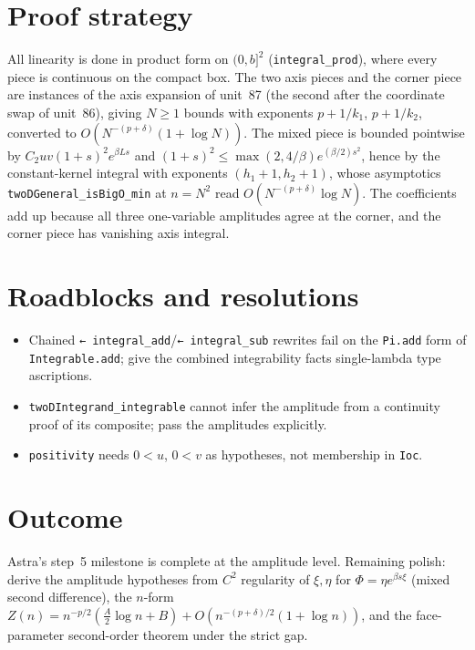 \documentclass[11pt]{article}
\begin{document}
\section{Proof strategy}
All linearity is done in product form on $(0,b]^2$ (\texttt{integral\_prod}), where every piece is
continuous on the compact box. The two axis pieces and the corner piece are instances of the axis
expansion of unit~87 (the second after the coordinate swap of unit~86), giving $N\ge1$ bounds with
exponents $p+1/k_1$, $p+1/k_2$, converted to $O(N^{-(p+\delta)}(1+\log N))$. The mixed piece is
bounded pointwise by $C_2uv(1+s)^2e^{\beta Ls}$ and $(1+s)^2\le\max(2,4/\beta)e^{(\beta/2)s^2}$, hence
by the constant-kernel integral with exponents $(h_1+1,h_2+1)$, whose asymptotics
\texttt{twoDGeneral\_isBigO\_min} at $n=N^2$ read $O(N^{-(p+\delta)}\log N)$. The coefficients add up
because all three one-variable amplitudes agree at the corner, and the corner piece has vanishing axis
integral.

\section{Roadblocks and resolutions}
\begin{itemize}
\item Chained \texttt{← integral\_add}/\texttt{← integral\_sub} rewrites fail on the \texttt{Pi.add}
form of \texttt{Integrable.add}; give the combined integrability facts single-lambda type ascriptions.
\item \texttt{twoDIntegrand\_integrable} cannot infer the amplitude from a continuity proof of its
composite; pass the amplitudes explicitly.
\item \texttt{positivity} needs $0<u$, $0<v$ as hypotheses, not membership in \texttt{Ioc}.
\end{itemize}

\section{Outcome}
Astra's step~5 milestone is complete at the amplitude level. Remaining polish: derive the amplitude
hypotheses from $C^2$ regularity of $\xi,\eta$ for $\Phi=\eta e^{\beta s\xi}$ (mixed second
difference), the $n$-form $Z(n)=n^{-p/2}(\tfrac A2\log n+B)+O(n^{-(p+\delta)/2}(1+\log n))$, and the
face-parameter second-order theorem under the strict gap.
\end{document}

